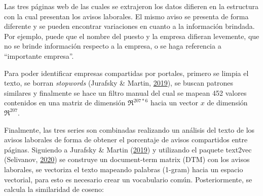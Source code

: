 \documentclass[12pt,oneside]{reedthesis}
\begin{document}
Las tres páginas web de las cuales se extrajeron los datos difieren en la estructura con la cual presentan los avisos laborales. El mismo aviso se presenta de forma diferente y se pueden encontrar variaciones en cuanto a la información brindada. Por ejemplo, puede que el nombre del puesto y la empresa difieran levemente, que no se brinde información respecto a la empresa, o se haga referencia a ``importante empresa''.

Para poder identificar empresas compartidas por portales, primero se limpia el texto, se borran \emph{stopwords} (Jurafsky \& Martin, \protect\hyperlink{ref-Jurasky2019}{2019}), se buscan patrones similares y finalmente se hace un filtro manual del cual se mapean 452 valores contenidos en una matriz de dimensión \(\Re^{207*6}\) hacia un vector \(x\) de dimensión \(\Re^{207}\).

Finalmente, las tres series son combinadas realizando un análisis del texto de los avisos laborales de forma de obtener el porcentaje de avisos compartidos entre páginas. Siguiendo a Jurafsky \& Martin (\protect\hyperlink{ref-Jurasky2019}{2019}) y utilizando el paquete text2vec (Selivanov, \protect\hyperlink{ref-text2vec}{2020}) se construye un document-term matrix (DTM) con los avisos laborales, se vectoriza el texto mapeando palabras (1-gram) hacia un espacio vectorial, para esto es necesario crear un vocabulario común. Posteriormente, se calcula la similaridad de coseno:
\end{document}
